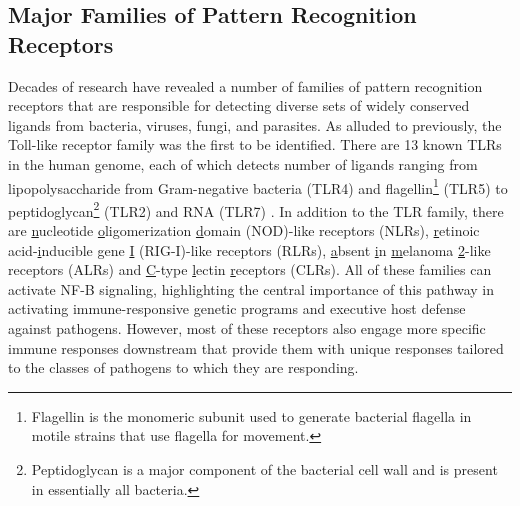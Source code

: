 \subsection{Major Families of Pattern Recognition Receptors}\label{prrs}

Decades of research have revealed a number of families of pattern recognition receptors that are responsible for detecting diverse sets of widely conserved ligands from bacteria, viruses, fungi, and parasites. As alluded to previously, the Toll-like receptor family was the first to be identified. There are 13 known TLRs in the human genome, each of which detects number of ligands ranging from lipopolysaccharide from Gram-negative bacteria (TLR4) and flagellin\footnote{Flagellin is the monomeric subunit used to generate bacterial flagella in motile strains that use flagella for movement.} (TLR5) to peptidoglycan\footnote{Peptidoglycan is a major component of the bacterial cell wall and is present in essentially all bacteria.} (TLR2) and RNA (TLR7) \citep{Kawai2007}. In addition to the TLR family, there are \underline{n}ucleotide \underline{o}ligomerization \underline{d}omain (NOD)-like receptors (NLRs), \underline{r}etinoic acid-\underline{i}nducible \underline{g}ene \underline{I} (RIG-I)-like receptors (RLRs), \underline{a}bsent \underline{i}n \underline{m}elanoma \underline{2}-like receptors (ALRs) and \underline{C}-type \underline{l}ectin \underline{r}eceptors (CLRs). All of these families can activate NF-\textkappa B signaling, highlighting the central importance of this pathway in activating immune-responsive genetic programs and executive host defense against pathogens. However, most of these receptors also engage more specific immune responses downstream that provide them with unique responses tailored to the classes of pathogens to which they are responding.

